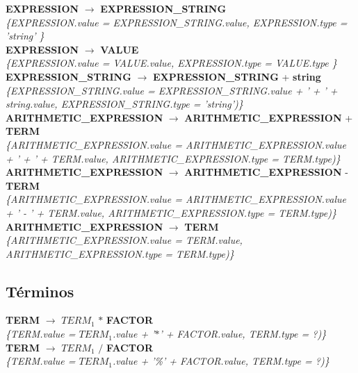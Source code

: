 \documentclass[10pt,a4paper]{article}
\begin{document}
\textbf{EXPRESSION} $\rightarrow$ \textbf{EXPRESSION\_STRING} \\
\textit{\{EXPRESSION.value =  EXPRESSION\_STRING.value, EXPRESSION.type = 'string' \}}  \\ 

\textbf{EXPRESSION} $\rightarrow$ \textbf{VALUE} \\
\textit{\{EXPRESSION.value =  VALUE.value, EXPRESSION.type = VALUE.type \}} \\

\textbf{EXPRESSION\_STRING} $\rightarrow$ \textbf{EXPRESSION\_STRING} + \textbf{string} \\ \textit{\{EXPRESSION\_STRING.value =  EXPRESSION\_STRING.value + ' + ' + string.value, EXPRESSION\_STRING.type = 'string')\}} \\

\textbf{ARITHMETIC\_EXPRESSION} $\rightarrow$ \textbf{ARITHMETIC\_EXPRESSION} + \textbf{TERM} \\
\textit{\{ARITHMETIC\_EXPRESSION.value =  ARITHMETIC\_EXPRESSION.value + ' + ' + TERM.value, ARITHMETIC\_EXPRESSION.type = TERM.type)\}} \\

\textbf{ARITHMETIC\_EXPRESSION} $\rightarrow$ \textbf{ARITHMETIC\_EXPRESSION} - \textbf{TERM}  \\
\textit{\{ARITHMETIC\_EXPRESSION.value =  ARITHMETIC\_EXPRESSION.value + ' - ' + TERM.value, ARITHMETIC\_EXPRESSION.type = TERM.type)\}} \\

\textbf{ARITHMETIC\_EXPRESSION} $\rightarrow$ \textbf{TERM} \\
\textit{\{ARITHMETIC\_EXPRESSION.value = TERM.value, ARITHMETIC\_EXPRESSION.type = TERM.type)\}}  \\

\subsection{Términos}
\textbf{TERM} $\rightarrow$ \textbf{$TERM_{1}$} $*$ \textbf{FACTOR}   \\
\textit{\{TERM.value = $TERM_{1}$.value + '$*$' + FACTOR.value, TERM.type = ?)\}} \\

\textbf{TERM} $\rightarrow$ \textbf{$TERM_{1}$} $/$ \textbf{FACTOR}   \\
\textit{\{TERM.value = $TERM_{1}$.value + '\%' + FACTOR.value, TERM.type = ?)\}} \\
\end{document}
